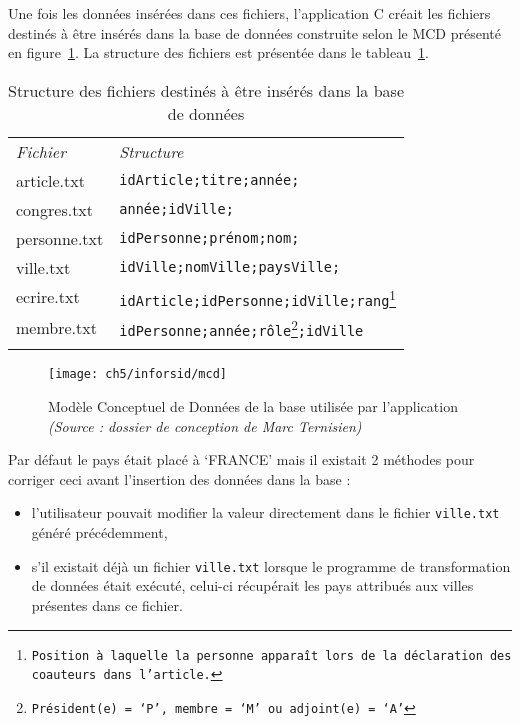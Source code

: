 				Une fois les données insérées dans ces fichiers, l\rq{}application C créait les fichiers destinés à être insérés dans la base de données construite selon le MCD présenté en figure~\ref{fig:mcd}. La structure des fichiers est présentée dans le tableau~\ref{tab:struct}.
				
				\begin{savenotes}%
				\begin{table}[h]
					\centering
					\caption{Structure des fichiers destinés à être insérés dans la base de données}\label{tab:struct}
					\begin{tabular}{ll}
						&\\
						\toprule
						\textit{Fichier} & \textit{Structure}\\
						\midrule
						article.txt		& \texttt{idArticle;titre;année;} \\
						congres.txt	& \texttt{année;idVille;} \\
						personne.txt	& \texttt{idPersonne;prénom;nom;} \\
						ville.txt		& \texttt{idVille;nomVille;paysVille;} \\
						ecrire.txt		& \texttt{idArticle;idPersonne;idVille;rang\footnote{Position à laquelle la personne apparaît lors de la déclaration des coauteurs dans l\rq{}article.}} \\
						membre.txt	& \texttt{idPersonne;année;rôle\footnote{Président(e) = \lq{}P\rq{}, membre = \lq{}M\rq{} ou adjoint(e) = \lq{}A\rq{}};idVille} \\
						\bottomrule
						&\\
					\end{tabular}
				\end{table}
				\end{savenotes}
				
				\begin{figure}[h]
					\center
					\texttt{[image: ch5/inforsid/mcd]}
					\caption{Modèle Conceptuel de Données de la base utilisée par l\rq{}application \textit{(Source : dossier de conception de Marc Ternisien)}}\label{fig:mcd}
				\end{figure}
	
				Par défaut le pays était placé à \lq{}FRANCE\rq{} mais il existait 2 méthodes pour corriger ceci avant l\rq{}insertion des données dans la base :
				\begin{itemize}
					\item l\rq{}utilisateur pouvait modifier la valeur directement dans le fichier \texttt{ville.txt} généré précédemment,
					\item s\rq{}il existait déjà un fichier \texttt{ville.txt} lorsque le programme de transformation de données était exécuté, celui-ci récupérait les pays attribués aux villes présentes dans ce fichier.
				\end{itemize}
	
